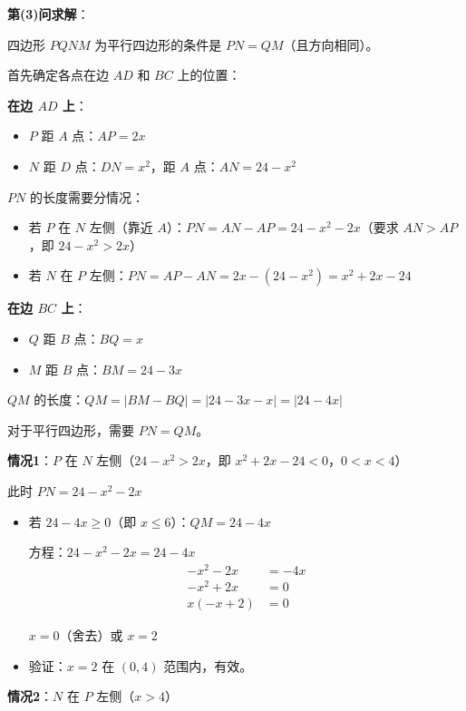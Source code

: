 \documentclass[UTF8]{ctexart}
\newenvironment{redenv}{\color{red}}{}
\newenvironment{detailedanalysis}{%
    \color{red}
    \begin{enumerate}[label=\textbf{第\arabic*步：}, leftmargin=*, align=left, itemsep=1.5ex]
}{%
    \end{enumerate}
}
\begin{document}
\begin{redenv}
\begin{detailedanalysis}
\noindent\textbf{第(3)问求解}：

四边形 $PQNM$ 为平行四边形的条件是 $PN = QM$（且方向相同）。

首先确定各点在边 $AD$ 和 $BC$ 上的位置：

\textbf{在边 $AD$ 上}：
\begin{itemize}
    \item $P$ 距 $A$ 点：$AP = 2x$
    \item $N$ 距 $D$ 点：$DN = x^2$，距 $A$ 点：$AN = 24 - x^2$
\end{itemize}

$PN$ 的长度需要分情况：
\begin{itemize}
    \item 若 $P$ 在 $N$ 左侧（靠近 $A$）：$PN = AN - AP = 24 - x^2 - 2x$（要求 $AN > AP$，即 $24 - x^2 > 2x$）
    \item 若 $N$ 在 $P$ 左侧：$PN = AP - AN = 2x - (24 - x^2) = x^2 + 2x - 24$
\end{itemize}

\textbf{在边 $BC$ 上}：
\begin{itemize}
    \item $Q$ 距 $B$ 点：$BQ = x$
    \item $M$ 距 $B$ 点：$BM = 24 - 3x$
\end{itemize}

$QM$ 的长度：$QM = |BM - BQ| = |24 - 3x - x| = |24 - 4x|$

对于平行四边形，需要 $PN = QM$。

\textbf{情况1}：$P$ 在 $N$ 左侧（$24 - x^2 > 2x$，即 $x^2 + 2x - 24 < 0$，$0 < x < 4$）

此时 $PN = 24 - x^2 - 2x$

\begin{itemize}
    \item 若 $24 - 4x \geq 0$（即 $x \leq 6$）：$QM = 24 - 4x$
    
    方程：$24 - x^2 - 2x = 24 - 4x$
    \begin{align*}
    -x^2 - 2x &= -4x \\
    -x^2 + 2x &= 0 \\
    x(-x + 2) &= 0
    \end{align*}
    
    $x = 0$（舍去）或 $x = 2$
    
    \item 验证：$x = 2$ 在 $(0, 4)$ 范围内，有效。
\end{itemize}

\textbf{情况2}：$N$ 在 $P$ 左侧（$x > 4$）


\end{detailedanalysis}
\end{redenv}
\end{document}
